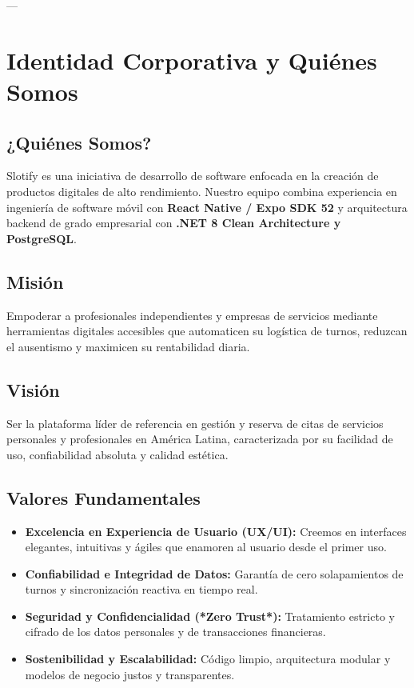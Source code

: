 \documentclass[11pt,a4paper]{article}
\begin{document}
---

\section{Identidad Corporativa y Quiénes Somos}

\subsection{¿Quiénes Somos?}
Slotify es una iniciativa de desarrollo de software enfocada en la creación de productos digitales de alto rendimiento. Nuestro equipo combina experiencia en ingeniería de software móvil con \textbf{React Native / Expo SDK 52} y arquitectura backend de grado empresarial con \textbf{.NET 8 Clean Architecture y PostgreSQL}.

\subsection{Misión}
Empoderar a profesionales independientes y empresas de servicios mediante herramientas digitales accesibles que automaticen su logística de turnos, reduzcan el ausentismo y maximicen su rentabilidad diaria.

\subsection{Visión}
Ser la plataforma líder de referencia en gestión y reserva de citas de servicios personales y profesionales en América Latina, caracterizada por su facilidad de uso, confiabilidad absoluta y calidad estética.

\subsection{Valores Fundamentales}
\begin{itemize}
    \item \textbf{Excelencia en Experiencia de Usuario (UX/UI):} Creemos en interfaces elegantes, intuitivas y ágiles que enamoren al usuario desde el primer uso.
    \item \textbf{Confiabilidad e Integridad de Datos:} Garantía de cero solapamientos de turnos y sincronización reactiva en tiempo real.
    \item \textbf{Seguridad y Confidencialidad (*Zero Trust*):} Tratamiento estricto y cifrado de los datos personales y de transacciones financieras.
    \item \textbf{Sostenibilidad y Escalabilidad:} Código limpio, arquitectura modular y modelos de negocio justos y transparentes.
\end{itemize}
\end{document}
